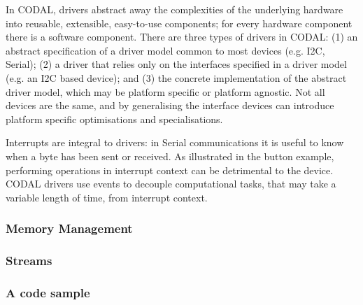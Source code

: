 In CODAL, drivers abstract away the complexities of the underlying hardware into reusable, extensible, easy-to-use components; for every hardware component there is a software component. There are three types of drivers in CODAL: (1) an abstract specification of a driver model common to most devices (e.g. I2C, Serial); (2) a driver that relies only on the interfaces specified in a driver model  (e.g. an I2C based device); and (3) the concrete implementation of the abstract driver model, which may be platform specific or platform agnostic. Not all devices are the same, and by generalising the interface devices can introduce platform specific optimisations and specialisations.

Interrupts are integral to drivers: in Serial communications it is useful to know when a byte has been sent or received. As illustrated in the button example, performing operations in interrupt context can be detrimental to the device. CODAL drivers use events to decouple computational tasks, that may take a variable length of time, from interrupt context.


\subsubsection{Memory Management}


\subsubsection{Streams}


\subsubsection{A code sample}


